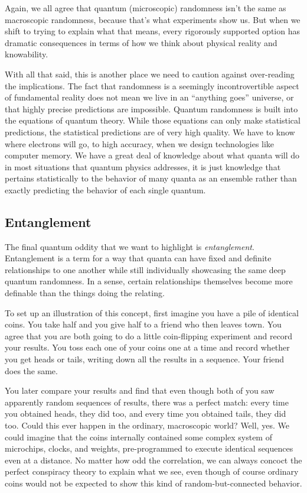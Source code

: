 \documentclass[onecolumn,preprintnumbers,amsmath,amssymbn,reprint,nofootinbib,superscriptaddress]{revtex4}    %
\begin{document}
Again, we all agree that quantum (microscopic) randomness isn't the same as macroscopic randomness, because that's what experiments show us.  But when we shift to trying to explain what that means, every rigorously supported option has dramatic consequences in terms of how we think about physical reality and knowability. 

With all that said, this is another place we need to caution against over-reading the implications.  The fact that randomness is a seemingly incontrovertible aspect of fundamental reality does not mean we live in an ``anything goes'' universe, or that highly precise predictions are impossible.  Quantum randomness is built into the equations of quantum theory.  While those equations can only make statistical predictions, the statistical predictions are of very high quality.  We have to know where electrons will go, to high accuracy, when we design technologies like computer memory.  We have a great deal of knowledge about what quanta will do in most situations that quantum physics addresses, it is just knowledge that pertains statistically to the behavior of many quanta as an ensemble rather than exactly predicting the behavior of each single quantum. 

\subsection{Entanglement}

The final quantum oddity that we want to highlight is {\em entanglement}.   Entanglement is a term for a way that quanta can have fixed and definite relationships to one another while still individually showcasing the same deep quantum randomness.  In a sense, certain relationships themselves become more definable than the things doing the relating.  

To set up an illustration of this concept, first imagine you have a pile of identical coins.  You take half and you give half to a friend who then leaves town.  You agree that you are both going to do a little coin-flipping experiment and record your results.  You toss each one of your coins one at a time and record whether you get heads or tails, writing down all the results in a sequence.  Your friend does the same.  

You later compare your results and find that even though both of you saw apparently random sequences of results, there was a perfect match:  every time you obtained heads, they did too, and every time you obtained tails, they did too.  Could this ever happen in the ordinary, macroscopic world?  Well, yes.  We could imagine that the coins internally contained some complex system of microchips, clocks, and weights, pre-programmed to execute identical sequences even at a distance.  No matter how odd the correlation, we can always concoct the perfect conspiracy theory to explain what we see, even though of course ordinary coins would not be expected to show this kind of random-but-connected behavior.  
\end{document}
